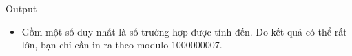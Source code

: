 Output  
\begin{itemize}
	\item     Gồm một số duy nhất là số trường hợp được tính đến. Do kết quả có thể rất lớn, bạn chỉ cần in ra theo modulo 1000000007.   
\end{itemize}